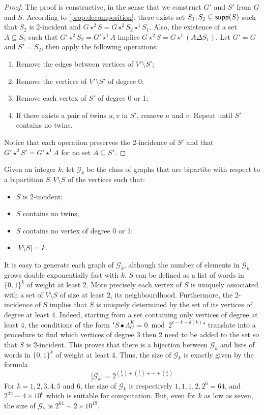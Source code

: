 \documentclass[a4paper,UKenglish,cleveref,autoref,thm-restate]{arxiv}
\newcommand{\se}{\subseteq}
\newcommand{\sm}{\setminus}
\newcommand{\supp}{\textup{\textsf{supp}}}
\begin{document}
\begin{proof}
    The proof is constructive, in the sense that we construct $G'$ and $S'$ from $G$ and $S$. According to \cref{prop:decomposition}, there exists set $S_1, S_2 \se \supp(S)$ such that $S_2$ is 2-incident and $G \star^2 S = G \star^2 S_2 \star^1 S_1$. Also, the existence of a set $A \se S_2$ such that $G' \star^2 S_2 = G' \star^1 A$ implies $G \star^2 S = G \star^1 (A \Delta S_1)$. Let $G' = G$ and $S' = S_2$, then apply the following operations:
    \begin{enumerate}
        \item Remove the edges between vertices of $V' \sm S'$;
        \item Remove the vertices of $V' \sm S'$ of degree 0;
        \item Remove each vertex of $S'$ of degree 0 or 1;
        \item If there exists a pair of twins $u,v$ in $S'$, remove $u$ and $v$. Repeat until $S'$ contains no twins.
    \end{enumerate}
    Notice that each operation preserves the 2-incidence of $S'$ and that  $G' \star^2 S' = G' \star^1 A$ for no set $A \se S'$.
\end{proof}

Given an integer $k$, let $\mathcal G_k$ be the class of graphs that are bipartite with respect to a bipartition $S, V \sm S$ of the vertices such that:
\begin{itemize}
    \item $S$ is 2-incident;
    \item $S$ contains no twins;
    \item $S$ contains no vertex of degree 0 or 1;
    \item $|V \sm S| = k$.
\end{itemize}
It is easy to generate each graph of $\mathcal G_k$, although the number of elements in $\mathcal G_k$ grows double exponentially fast with $k$. $S$ can be defined as a list of words in $\{0,1\}^k$ of weight at least 2. More precisely each vertex of $S$ is uniquely associated with a set of $V \sm S$ of size at least 2, its neighbourdhood. Furthermore, the 2-incidence of $S$ implies that $S$ is uniquely determined by the set of its vertices of degree at least 4. Indeed, starting from a set containing only vertices of degree at least 4, the conditions of the form "$S\bullet \Lambda_G^K = 0 \bmod 2^{r-k-\delta(k)}$" translate into a procedure to find which vertices of degree 3 then 2 need to be added to the set so that $S$ is 2-incident. This proves that there is a bijection between $\mathcal G_k$ and lists of words in $\{0,1\}^k$ of weight at least 4. Thus, the size of $\mathcal G_k$ is exactly given by the formula $$ |\mathcal G_k| = 2^{\binom{k}{4} + \binom{k}{5} + \cdots + \binom{k}{k}}$$
For $k=1,2,3,4,5$ and $6$, the size of $\mathcal G_k$ is respectively $1,1,1,2,2^6 = 64$, and $2^{22} \sim 4 \times 10^6$ which is suitable for computation. But, even for $k$ as low as seven, the size of $\mathcal G_7$ is $2^{64} \sim 2 \times 10^{19}$.
\end{document}
